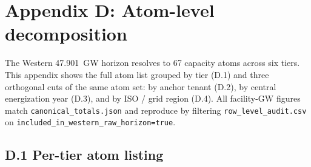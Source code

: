
\newpage
\section*{Appendix D: Atom-level decomposition}

\noindent The Western 47.901~GW horizon resolves to 67 capacity atoms across six tiers. This appendix shows the full atom list grouped by tier (D.1) and three orthogonal cuts of the same atom set: by anchor tenant (D.2), by central energization year (D.3), and by ISO / grid region (D.4). All facility-GW figures match \texttt{canonical\_totals.json} and reproduce by filtering \texttt{row\_level\_audit.csv} on \texttt{included\_in\_western\_raw\_horizon=true}.

\subsection*{D.1 \quad Per-tier atom listing}


